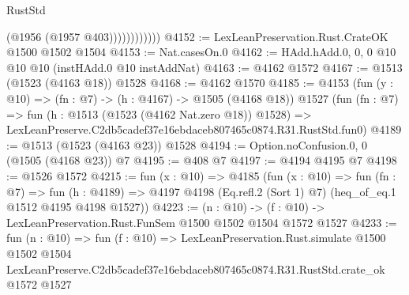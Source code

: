 \begin{lexlean}{RustStd}
\begin{coremodule}
                        (@1956 (@1957 @403))))))))))))
@4152 := LexLeanPreservation.Rust.CrateOK @1500 @1502 @1504
@4153 := Nat.casesOn.{0}
@4162 := HAdd.hAdd.{0, 0, 0} @10 @10 @10 (instHAdd.{0} @10 instAddNat)
@4163 := @4162 @1572
@4167 := @1513 (@1523 (@4163 @18)) @1528
@4168 := @4162 @1570
@4185 := @4153
    (fun (y : @10) => (fn : @7) -> (h : @4167) -> @1505 (@4168 @18))
    @1527
    (fun (fn : @7) =>
    fun (h : @1513 (@1523 (@4162 Nat.zero @18)) @1528) =>
    LexLeanPreserve.C2db5cadef37e16ebdaceb807465c0874.R31.RustStd.fun0)
@4189 := @1513 (@1523 (@4163 @23)) @1528
@4194 := Option.noConfusion.{0, 0} (@1505 (@4168 @23)) @7
@4195 := @408 @7
@4197 := @4194 @4195 @7
@4198 := @1526 @1572
@4215 := fun (x : @10) =>
  @4185
    (fun (x : @10) =>
    fun (fn : @7) =>
    fun (h : @4189) =>
    @4197 @4198 (Eq.refl.{2} (Sort 1) @7) (heq_of_eq.{1} @1512 @4195 @4198 @1527))
@4223 := (n : @10) -> (f : @10) -> LexLeanPreservation.Rust.FunSem @1500 @1502 @1504 @1572 @1527
@4233 := fun (n : @10) =>
  fun (f : @10) =>
  LexLeanPreservation.Rust.simulate
    @1500
    @1502
    @1504
    LexLeanPreserve.C2db5cadef37e16ebdaceb807465c0874.R31.RustStd.crate_ok
    @1572
    @1527
\end{coremodule}
\end{lexlean}
